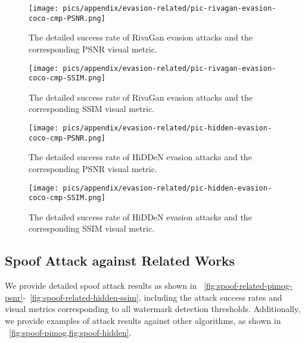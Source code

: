 \begin{figure}[!t]
\begin{minipage}{0.48\linewidth}
    \centering
    \texttt{[image: pics/appendix/evasion-related/pic-rivagan-evasion-coco-cmp-PSNR.png]} 
    
    \vspace{-6mm}
    \caption{The detailed success rate of RivaGan evasion attacks and the corresponding PSNR visual metric.}
    \label{fig:evasion-related-rivagan-psnr}
\end{minipage}\hfill
\begin{minipage}{0.48\linewidth}
    \centering
    \texttt{[image: pics/appendix/evasion-related/pic-rivagan-evasion-coco-cmp-SSIM.png]} 
    
    \vspace{-6mm}
    \caption{The detailed success rate of RivaGan evasion attacks and the corresponding SSIM visual metric.}
    \label{fig:evasion-related-rivagan-ssim}
\end{minipage}
\end{figure}

\begin{figure}[!t]
\begin{minipage}{0.48\linewidth}
    \centering
    \texttt{[image: pics/appendix/evasion-related/pic-hidden-evasion-coco-cmp-PSNR.png]} 
    
    \vspace{-6mm}
    \caption{The detailed success rate of HiDDeN evasion attacks and the corresponding PSNR visual metric.}
    \label{fig:evasion-related-hidden-psnr}
\end{minipage}\hfill
\begin{minipage}{0.48\linewidth}
    \centering
    \texttt{[image: pics/appendix/evasion-related/pic-hidden-evasion-coco-cmp-SSIM.png]} 
    
    \vspace{-6mm}
    \caption{The detailed success rate of HiDDeN evasion attacks and the corresponding SSIM visual metric.}
    \label{fig:evasion-related-hidden-ssim}
\end{minipage}
\end{figure}

\subsection{Spoof Attack against Related Works}\label{sec:Appendix_Additional Experimental Results_Spoof Attack}
We provide detailed spoof attack results as shown in ~\cref{fig:spoof-related-pimog-psnr}-~\cref{fig:spoof-related-hidden-ssim}, including the attack success rates and visual metrics corresponding to all watermark detection thresholds. Additionally, we provide examples of attack results against other algorithms, as shown in ~\cref{fig:spoof-pimog,fig:spoof-hidden}.

